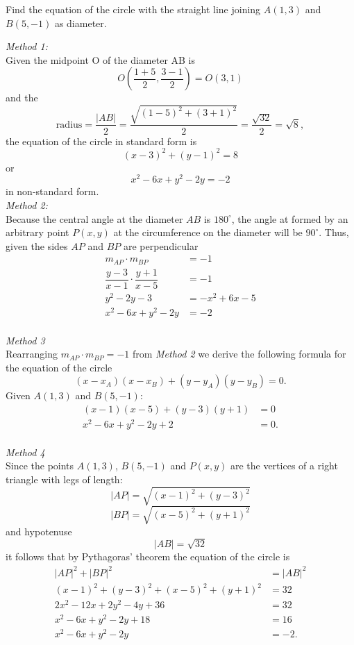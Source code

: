 \documentclass[12pt,addpoints,noanswers]{exam}
\begin{document}
\begin{questions}
\question Find the equation of the circle with the straight line joining $A(1,3)$ and $B(5, -1)$ as diameter.
\begin{solution}[2in]
\textit{Method 1:}\\
Given the midpoint O of the diameter AB is 
$$O\left(\dfrac{1+5}{2}, \dfrac{3-1}{2}\right)
=O(3,1)$$ and the
$$ \text{radius} 
= \dfrac{|AB|}{2} 
=\dfrac{\sqrt{(1-5)^2+(3+1)^2}}{2} 
=\dfrac{\sqrt{32}}{2} 
= \sqrt{8},$$ 
the equation of the circle in standard form is 
\[ (x-3)^2+(y-1)^2 = 8 \] 
or
\[x^2-6x+y^2-2y=-2\]
in non-standard form.
\\
\textit{Method 2:}\\
Because the central angle at the diameter $AB$ is $180^\circ$, the angle at formed by an arbitrary point $P(x,y)$ at the circumference on the diameter will be $90^\circ$. Thus, given the sides $AP$ and $BP$ are perpendicular\\
\begin{align*}
m_{AP}\cdot m_{BP} &= -1 \\
\dfrac{y-3}{x-1} \cdot \dfrac{y+1}{x-5} &= -1\\
y^2-2y-3 &= -x^2 +6x - 5\\
x^2 -6x +y^2 -2y &=-2
\end{align*}
\\
\textit{Method 3}\\
Rearranging $ m_{AP}\cdot m_{BP} = -1 $ from \textit{Method 2} we derive the following formula for the equation of the circle
\[ (x-x_A)(x-x_B)+(y-y_A)(y-y_B)=0. \]
Given $A(1,3)$ and $B(5,-1)$:
\begin{align*}
(x-1)(x-5)+(y-3)(y+1) &= 0\\
x^2-6x+y^2-2y+2&= 0.
\end{align*} 
\\
\textit{Method 4}\\
Since the points $A(1,3)$, $B(5, -1)$ and $P(x,y)$ are the vertices of a right triangle with legs of length:
$$|AP|= \sqrt{(x-1)^2+(y-3)^2}$$
$$|BP|= \sqrt{(x-5)^2+(y+1)^2}$$
and hypotenuse
$$|AB|= \sqrt{32} $$ 
it follows that by Pythagoras' theorem the equation of the circle is
\begin{align*}
|AP|^2 + |BP|^2 &= |AB|^2\\
(x-1)^2+(y-3)^2 + (x-5)^2+(y+1)^2 &= 32\\
2x^2- 12x + 2y^2 - 4y +36 &= 32\\
x^2-6x+ y^2 - 2y + 18 &= 16\\
x^2 -6x +y^2 -2y &=-2.
\end{align*}
\end{solution}




\end{questions}
\end{document}
